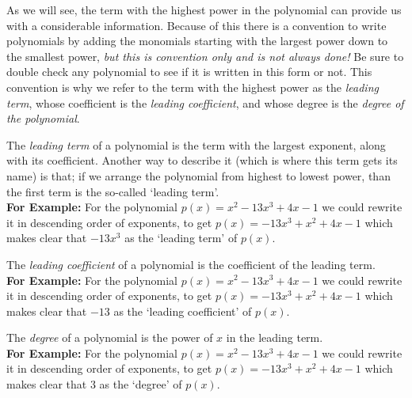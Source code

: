 \documentclass{ximera}
\begin{document}
As we will see, the term with the highest power in the polynomial can provide us with a considerable information. Because of this there is a convention to write polynomials by adding the monomials starting with the largest power down to the smallest power, \textit{but this is convention only and is not always done!} Be sure to double check any polynomial to see if it is written in this form or not. This convention is why we refer to the term with the highest power as the \textit{leading term}, whose coefficient is the \textit{leading coefficient}, and whose degree is the \textit{degree of the polynomial}.

\begin{definition}
    The \textit{leading term} of a polynomial is the term with the largest exponent, along with its coefficient. Another way to describe it (which is where this term gets its name) is that; if we arrange the polynomial from highest to lowest power, than the first term is the so-called `leading term'.\\
    \textbf{For Example:} For the polynomial $p(x) = x^2 - 13x^3 + 4x - 1$ we could rewrite it in descending order of exponents, to get $p(x) = -13x^3 + x^2 + 4x - 1$ which makes clear that $-13x^3$ as the `leading term' of $p(x)$.
\end{definition} 

\begin{definition}
    The \textit{leading coefficient} of a polynomial is the coefficient of the leading term.\\
    \textbf{For Example:} For the polynomial $p(x) = x^2 - 13x^3 + 4x - 1$ we could rewrite it in descending order of exponents, to get $p(x) = -13x^3 + x^2 + 4x - 1$ which makes clear that $-13$ as the `leading coefficient' of $p(x)$.
\end{definition} 

\begin{definition}
    The \textit{degree} of a polynomial is the power of $x$ in the leading term.\\
    \textbf{For Example:} For the polynomial $p(x) = x^2 - 13x^3 + 4x - 1$ we could rewrite it in descending order of exponents, to get $p(x) = -13x^3 + x^2 + 4x - 1$ which makes clear that $3$ as the `degree' of $p(x)$.
\end{definition} 
\end{document}
